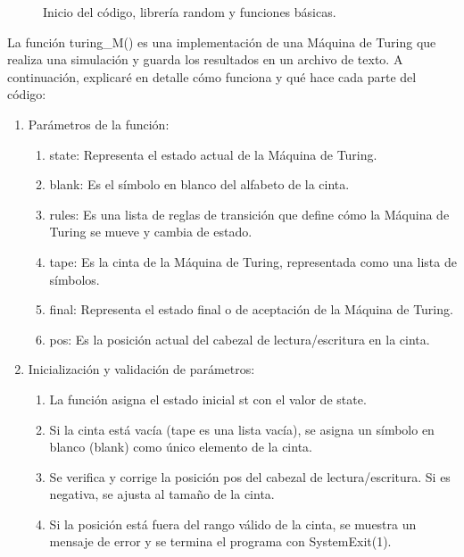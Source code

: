 \begin{figure}[h]
\begin{center}
\end{center}
\caption{Inicio del código, librería random y funciones básicas.}
\label{fig:imagen}
\end{figure}

La función turing\_M() es una implementación de una Máquina de Turing que realiza una simulación y guarda los resultados en un archivo de texto. A continuación, explicaré en detalle cómo funciona y qué hace cada parte del código:\newline
\begin{enumerate}
    \item Parámetros de la función:\newline
    \begin{enumerate}
        \item state: Representa el estado actual de la Máquina de Turing.\newline
        \item blank: Es el símbolo en blanco del alfabeto de la cinta.\newline
        \item rules: Es una lista de reglas de transición que define cómo la Máquina de Turing se mueve y cambia de estado.\newline
        \item tape: Es la cinta de la Máquina de Turing, representada como una lista de símbolos.\newline
        \item final: Representa el estado final o de aceptación de la Máquina de Turing.\newline
        \item pos: Es la posición actual del cabezal de lectura/escritura en la cinta.\newline
    \end{enumerate}
    
    \item Inicialización y validación de parámetros:\newline
    \begin{enumerate}
        \item La función asigna el estado inicial st con el valor de state.\newline
        \item Si la cinta está vacía (tape es una lista vacía), se asigna un símbolo en blanco (blank) como único elemento de la cinta.\newline
        \item Se verifica y corrige la posición pos del cabezal de lectura/escritura. Si es negativa, se ajusta al tamaño de la cinta.\newline
        \item Si la posición está fuera del rango válido de la cinta, se muestra un mensaje de error y se termina el programa con SystemExit(1).\newline
    \end{enumerate}
    

\end{enumerate}
